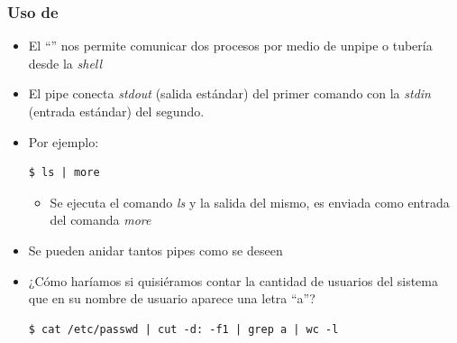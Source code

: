 \begin{frame}[fragile]
  	\frametitle{Uso de \textbf{\textbar}}
  	\begin{itemize}
		\item El ``\textbar'' nos permite comunicar dos procesos 
		por medio de unpipe o tubería desde la \emph{shell}
		\item El pipe conecta \textit{stdout} (salida estándar) del primer comando con la \textit{stdin} (entrada estándar) del segundo.
		\item Por ejemplo:	
		\begin{lstlisting}
$ ls | more
		\end{lstlisting}
		\begin{itemize}			
			\item Se ejecuta el comando \emph{ls} y la salida del mismo, es enviada como entrada del comanda \emph{more}
		\end{itemize}
		\item Se pueden anidar tantos pipes como se deseen
		\item ¿Cómo haríamos si quisiéramos contar la cantidad de usuarios del sistema que en su nombre de usuario aparece una letra ``a''?
		\pause
		\begin{lstlisting}
$ cat /etc/passwd | cut -d: -f1 | grep a | wc -l
		\end{lstlisting}
  	\end{itemize}
\end{frame}
